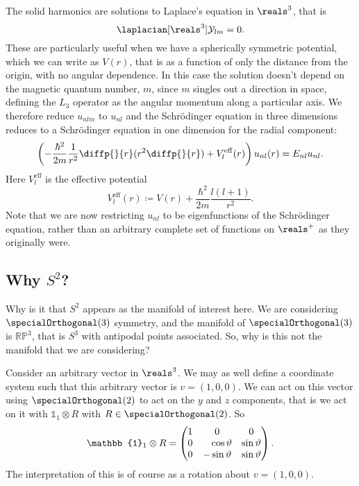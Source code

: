 \documentclass[fleqn]{NotesClass}
\newcommand*{\ident}{\mathbb{1}}
\newcommand*{\directproduct}{\otimes}
\begin{document}
    The solid harmonics are solutions to Laplace's equation in \(\reals^3\), that is
    \begin{equation}
        \laplacian[\reals^3] \mathcal{Y}_{lm} = 0.
    \end{equation}
    These are particularly useful when we have a spherically symmetric potential, which we can write as \(V(r)\), that is as a function of only the distance from the origin, with no angular dependence.
    In this case the solution doesn't depend on the magnetic quantum number, \(m\), since \(m\) singles out a direction in space, defining the \(L_3\) operator as the angular momentum along a particular axis.
    We therefore reduce \(u_{nlm}\) to \(u_{nl}\) and the Schrödinger equation in three dimensions reduces to a Schrödinger equation in one dimension for the radial component:
    \begin{equation}
        \left( -\frac{\hbar^2}{2m}\frac{1}{r^2}\diffp{}{r}(r^2\diffp{}{r}) + V_l^{\mathrm{eff}}(r) \right) u_{nl}(r) = E_{nl}u_{nl}.
    \end{equation}
    Here \(V_l^{\mathrm{eff}}\) is the effective potential
    \begin{equation}
        V_l^{\mathrm{eff}}(r) \coloneqq V(r) + \frac{\hbar^2}{2m}\frac{l(l + 1)}{r^2}.
    \end{equation}
    Note that we are now restricting \(u_{nl}\) to be eigenfunctions of the Schrödinger equation, rather than an arbitrary complete set of functions on \(\reals^+\) as they originally were.
    
    \subsection{Why \texorpdfstring{\(S^2\)}{S2}?}
    Why is it that \(S^2\) appears as the manifold of interest here.
    We are considering \(\specialOrthogonal(3)\) symmetry, and the manifold of \(\specialOrthogonal(3)\) is \(\mathbb{RP}^3\), that is \(S^3\) with antipodal points associated.
    So, why is this not the manifold that we are considering?
    
    Consider an arbitrary vector in \(\reals^3\).
    We may as well define a coordinate system such that this arbitrary vector is \(v = (1, 0, 0)\).
    We can act on this vector using \(\specialOrthogonal(2)\) to act on the \(y\) and \(z\) components, that is we act on it with \(\ident_1 \directproduct R\) with \(R \in \specialOrthogonal(2)\).
    So
    \begin{equation}
        \ident_1 \directproduct R = 
        \begin{pmatrix}
            1 & 0 & 0\\
            0 & \hphantom{-}\cos\vartheta & \sin\vartheta\\
            0 & -\sin\vartheta & \sin\vartheta
        \end{pmatrix}
        .
    \end{equation}
    The interpretation of this is of course as a rotation about \(v = (1, 0, 0)\).
    
\end{document}
